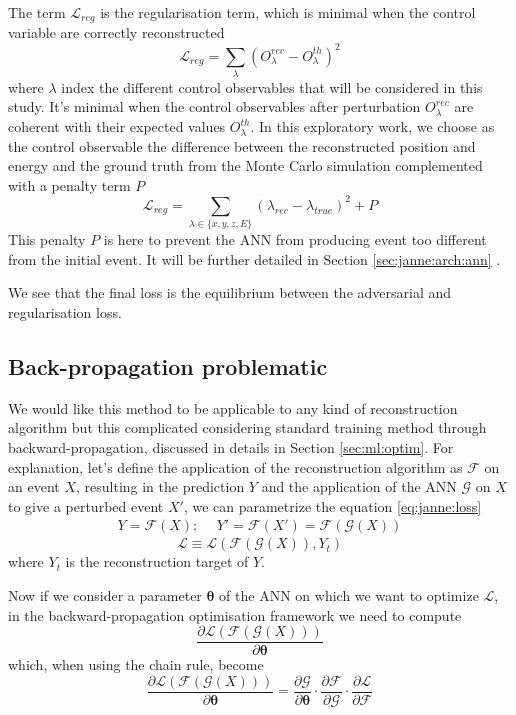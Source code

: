 \documentclass[../main.tex]{subfiles}
\begin{document}
The term $\mathcal{L}_{reg}$ is the regularisation term, which is minimal when the control variable are correctly reconstructed
\begin{equation}
  \mathcal{L}_{reg} = \sum_\lambda (O^{rec}_\lambda - O^{th}_\lambda)^2
\end{equation}
where $\lambda$ index the different control observables that will be considered in this study. It's minimal when the control observables after perturbation $O^{rec}_\lambda$ are coherent with their expected values $O^{th}_\lambda$.
In this exploratory work, we choose as the control observable the difference between the reconstructed position and energy and the ground truth from the Monte Carlo simulation complemented with a penalty term $P$
\begin{equation}
  \label{eq:janne:lreg}
  \mathcal{L}_{reg} = \sum_{\lambda \in \{x, y, z, E\}} (\lambda_{rec} - \lambda_{true})^2 + P
\end{equation}
This penalty $P$ is here to prevent the ANN from producing event too different from the initial event. It will be further detailed in Section \ref{sec:janne:arch:ann}
.

We see that the final loss is the equilibrium between the adversarial and regularisation loss.

\subsection{Back-propagation problematic}
\label{sec:janne:back_prop}

We would like this method to be applicable to any kind of reconstruction algorithm but this complicated considering standard training method through backward-propagation, discussed in details in Section \ref{sec:ml:optim}. For explanation, let's define the application of the reconstruction algorithm as $\mathcal{F}$ on an event $X$, resulting in the prediction $Y$ and the application of the ANN $\mathcal{G}$ on $X$ to give a perturbed event $X'$, we can parametrize the equation \ref{eq:janne:loss}
\begin{align}
  Y = \mathcal{F}(X); ~~& Y' = \mathcal{F}(X') = \mathcal{F}(\mathcal{G}(X))
\end{align}
\begin{equation}
  \mathcal{L} \equiv \mathcal{L}(\mathcal{F}(\mathcal{G}(X)), Y_t)
\end{equation}
where $Y_t$ is the reconstruction target of $Y$.

Now if we consider a parameter $\bm{\theta}$ of the ANN on which we want to optimize $\mathcal{L}$, in the backward-propagation optimisation framework we need to compute
\begin{equation}
  \frac{\partial \mathcal{L}(\mathcal{F}(\mathcal{G}(X)))}{\partial \bm{\theta}}
\end{equation}
which, when using the chain rule, become
\begin{equation}
  \frac{\partial \mathcal{L}(\mathcal{F}(\mathcal{G}(X)))}{\partial \bm{\theta}} = \frac{\partial \mathcal{G}}{\partial \bm{\theta}} \cdot \frac{\partial \mathcal{F}}{\partial \mathcal{G}} \cdot \frac{\partial \mathcal{L}}{\partial \mathcal{F}}
\end{equation}
\end{document}
